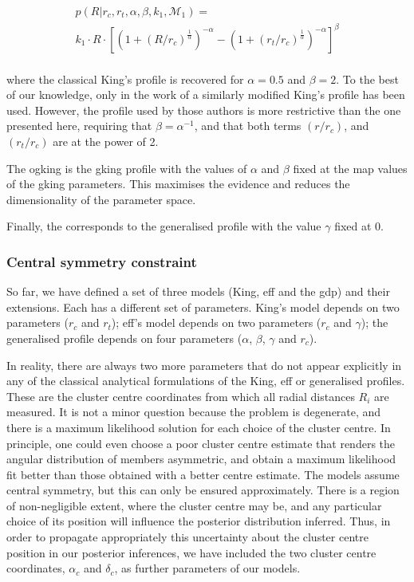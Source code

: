\begin{multline}
  p(R|r_c, r_t,\alpha,\beta, k_1,\mathcal{M}_1)=\\
  k_1\cdot R \cdot
  \left[
  \left(1+(R/r_c)^{\frac{1}{\alpha}}\right)^{-\alpha}
  -
  \left(1+(r_t/r_c)^{\frac{1}{\alpha}}\right)^{-\alpha}
  \right]^{\beta}\\
\label{eq:GKing}
\end{multline}

where the classical King's profile is recovered for $\alpha=0.5$ and
$\beta=2$. To the best of our knowledge, only in the work of \citet{2017MNRAS.466.1513R} 
a similarly modified King's profile has been used. However, the profile used by those authors is more restrictive 
than the one presented here, requiring that $\beta = \alpha^{-1}$, and that both terms $(r/r_c)$, and $(r_t/r_c)$ are at the power of 2.


The \gls{ogking} is the \gls{gking}
profile with the values of $\alpha$ and $\beta$ fixed at 
the \gls{map} values of the \gls{gking} parameters. 
This maximises the evidence and reduces the dimensionality
of the parameter space.

Finally, the  corresponds to the
generalised profile with the value $\gamma$ fixed at 0.

\subsubsection{Central symmetry constraint}
\label{sect:centralsym}

So far, we have defined a set of three models (King, \gls{eff} and the \gls{gdp}) 
and their extensions. Each has a different set
of parameters.  King's model depends on two parameters ($r_c$ and
$r_t$); \gls{eff}'s model depends on two parameters ($r_c$ and $\gamma$); the
generalised profile depends on four parameters ($\alpha$, $\beta$, $\gamma$
and $r_c$).

In reality, there are always two more parameters that do not appear
explicitly in any of the classical analytical formulations of the
King, \gls{eff} or generalised profiles. These are the cluster centre
coordinates from which all radial distances $R_i$ are measured. It is
not a minor question because the problem is degenerate, and there is a
maximum likelihood solution for each choice of the cluster centre. In
principle, one could even choose a poor cluster centre estimate that
renders the angular distribution of members asymmetric, and obtain
a maximum likelihood fit better than those obtained with a better
centre estimate.  The models assume central symmetry, but this can
only be ensured approximately. There is a region of non-negligible
extent, where the cluster centre may be, and any particular choice of
its position will influence the posterior distribution inferred. Thus,
in order to propagate appropriately this uncertainty about the cluster
centre position in our posterior inferences, we have included the two
cluster centre coordinates, $\alpha_c$ and $\delta_c$,
 as further parameters of our models.

